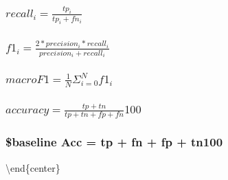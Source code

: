\documentclass[]{article}
\begin{document}
\subsubsection{\texorpdfstring{\(recall_i = \frac{tp_i} {tp_i + fn_i}\)}{recall\_i = \textbackslash{}frac\{tp\_i\} \{tp\_i + fn\_i\}}}\label{recall_i-fractp_i-tp_i-fn_i}

\subsubsection{\texorpdfstring{\(f1_i = \frac{2 * precision_i * recall_i} {precision_i + recall_i}\)}{f1\_i = \textbackslash{}frac\{2 * precision\_i * recall\_i\} \{precision\_i + recall\_i\}}}\label{f1_i-frac2-precision_i-recall_i-precision_i-recall_i}

\subsubsection{\texorpdfstring{\(macro F1 = \frac{1} {N}\Sigma^N_{i=0}f1_i\)}{macro F1 = \textbackslash{}frac\{1\} \{N\}\textbackslash{}Sigma\^{}N\_\{i=0\}f1\_i}}\label{macro-f1-frac1-nsigman_i0f1_i}

\subsubsection{\texorpdfstring{\(accuracy = \frac{tp + tn} {tp + tn + fp + fn}100\)}{accuracy = \textbackslash{}frac\{tp + tn\} \{tp + tn + fp + fn\}100}}\label{accuracy-fractp-tn-tp-tn-fp-fn100}

\subsubsection{\texorpdfstring{\$baseline Acc =
 {tp + fn + fp + tn}100}{\$baseline Acc = 100}}\label{baseline-acc-100}

\textbackslash{}end\{center\}
\end{document}
